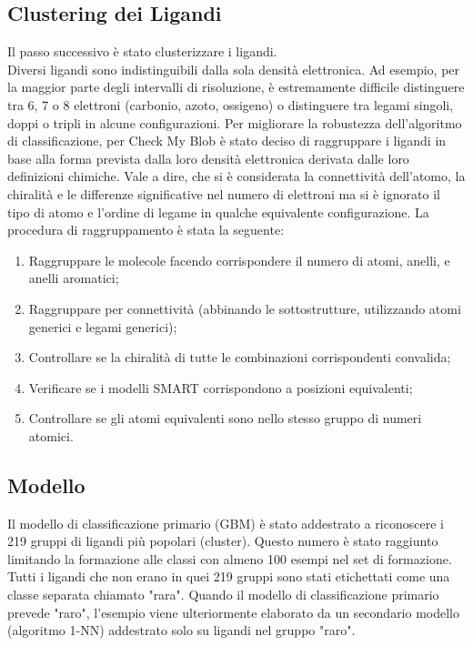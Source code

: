 \documentclass{article}
\begin{document}
\subsection{Clustering dei Ligandi}
Il passo successivo è stato clusterizzare i ligandi.\\Diversi ligandi sono indistinguibili dalla sola densità elettronica. Ad esempio, per la maggior parte degli intervalli di risoluzione, è estremamente difficile distinguere tra 6, 7 o 8 elettroni (carbonio, azoto, ossigeno) 
o distinguere tra legami singoli, doppi o tripli in alcune configurazioni. Per migliorare la robustezza dell'algoritmo di classificazione, per Check My Blob è stato deciso di raggruppare i ligandi in base alla forma prevista dalla loro densità elettronica derivata 
dalle loro definizioni chimiche. Vale a dire, che si è considerata la connettività dell'atomo, la chiralità e le differenze significative nel numero di elettroni ma si è ignorato il tipo di atomo e l'ordine di legame in qualche equivalente configurazione. La procedura di raggruppamento è stata la seguente:
\begin{enumerate}
  \item Raggruppare le molecole facendo corrispondere il numero di atomi, anelli, e anelli aromatici;
  \item Raggruppare per connettività (abbinando le sottostrutture, utilizzando atomi generici e legami generici);
  \item Controllare se la chiralità di tutte le combinazioni corrispondenti convalida;
  \item Verificare se i modelli SMART corrispondono a posizioni equivalenti;
  \item Controllare se gli atomi equivalenti sono nello stesso gruppo di numeri atomici.
\end{enumerate}
\subsection{Modello}
Il modello di classificazione primario (GBM) è stato addestrato a riconoscere i 219 gruppi di ligandi più popolari (cluster). Questo numero è stato raggiunto limitando la formazione alle classi con almeno 100 esempi nel set di formazione. 
Tutti i ligandi che non erano in quei 219 gruppi sono stati etichettati come una classe separata chiamato "rara". Quando il modello di classificazione primario prevede "raro", l'esempio viene ulteriormente elaborato da un secondario modello (algoritmo 1-NN) addestrato solo su ligandi nel gruppo "raro".
\end{document}
